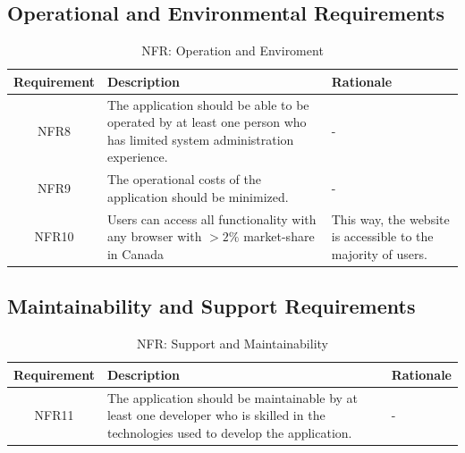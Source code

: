 \documentclass[fullpage]{article}
\begin{document}
\subsection{Operational and Environmental Requirements}
\begin{table}[h!]
\flushleft
\begin{tabular}{|c|p{6cm}|p{6cm}|}
\hline
 \rowcolor{lightgray} 
\textbf{Requirement} & \textbf{Description} & \textbf{Rationale} \\
\hline
NFR8 & The application should be able to be operated by at least one person who has limited system administration experience. & -\\
\hline
NFR9&The operational costs of the application should be minimized. & -\\
\hline
NFR10 &Users can access all functionality with any browser with $>2\%$ market-share in Canada \cite{website} & This way, the website is accessible to the majority of users.\\
\hline
\end{tabular}
\caption{NFR: Operation and Enviroment}
\end{table}


\subsection{Maintainability and Support Requirements}
\begin{table}[h!]
\flushleft
\begin{tabular}{|c|p{6cm}|p{6cm}|}
\hline
 \rowcolor{lightgray} 
\textbf{Requirement} & \textbf{Description} & \textbf{Rationale} \\
\hline
NFR11 & The application should be maintainable by at least one developer who is skilled in the technologies used to develop the application. & -\\
\hline
\end{tabular}
\caption{NFR: Support and Maintainability}
\end{table}
\end{document}
